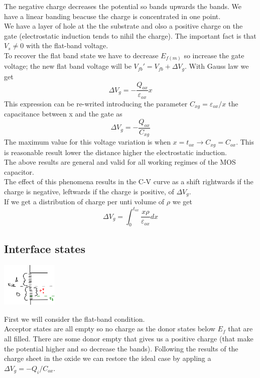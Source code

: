 The negative charge decreases the potential so bands upwards the bands. We have a linear banding beacuse the charge is concentrated in one point.\\
We have a layer of hole at the the substrate and olso a positive charge on the gate (electrostatic induction tends to nihil the charge). The important fact is that $V_s\neq0$ with the flat-band voltage.\\
To recover the flat band state we have to decrease $E_{f(m)}$ so increase the gate voltage; the new flat band voltage will be $V_{fb}'=V_{fb}+\Delta V_g$. With Gauss law we get
\begin{equation}
\Delta V_g=-\frac{Q_{ox}}{\varepsilon_{ox}}x
\end{equation}
This expression can be re-writed introducing the parameter $C_{xg}=\varepsilon_{ox}/x$ the capacitance between x and the gate as
\begin{equation}
\Delta V_g=-\frac{Q_{ox}}{C_{xg}}
\end{equation}
The maximum value for this voltage variation is when $x=t_{ox}\rightarrow C_{xg}=C_{ox}$. This is reasonable result lower the distance higher the electrostatic induction.\\
The above results are general and valid for all working regimes of the MOS capacitor.\\
The effect of this phenomena results in the C-V curve as a shift rightwards if the charge is negative, leftwards if the charge is positive, of $\Delta V_g$.\\
If we get a distribution of charge per unti volume of $\rho$ we get 
\begin{equation}
\Delta V_g=\int_0^{t_{ox}}\frac{x\rho}{\varepsilon_{ox}}dx
\end{equation}

\subsection{Interface states}

\centering
\includegraphics[width=0.2\textwidth]{istafb.png}\\
\raggedright

First we will consider the flat-band condition.\\
Acceptor states are all empty so no charge as the donor states below $E_f$ that are all filled. There are some donor empty that gives us a positive charge (that make the potential higher and so decrease the bands). Following the results of the charge sheet in the oxide we can restore the ideal case by appling a $\Delta V_g= -Q_i/C_{ox}$.\\

